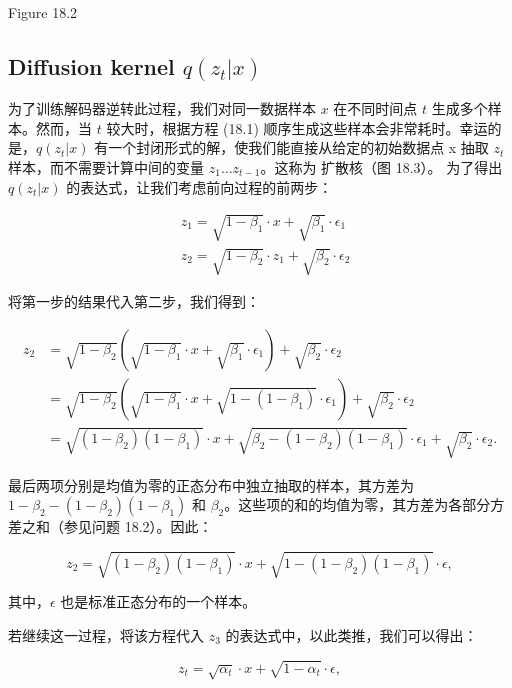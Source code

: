Figure 18.2
\subsection{Diffusion kernel \(q(z_t|x)\)}
为了训练解码器逆转此过程，我们对同一数据样本 \(x\) 在不同时间点 \(t\) 生成多个样本。然而，当 \(t\) 较大时，根据方程 (18.1) 顺序生成这些样本会非常耗时。幸运的是，\(q(z_t|x)\) 有一个封闭形式的解，使我们能直接从给定的初始数据点 x 抽取 \(z_t\) 样本，而不需要计算中间的变量 \(z_1 \ldots z_{t-1}\)。这称为 扩散核（图 18.3）。 为了得出 \(q(z_t|x)\) 的表达式，让我们考虑前向过程的前两步：


\begin{align}
&z_1 = \sqrt{1 - \beta_1} \cdot x + \sqrt{\beta_1} \cdot \epsilon_1 \\
&z_2 = \sqrt{1 - \beta_2} \cdot z_1 + \sqrt{\beta_2} \cdot \epsilon_2 
\end{align} 


将第一步的结果代入第二步，我们得到：

\begin{align}
z_2 &= \sqrt{1 - \beta_2} \left( \sqrt{1 - \beta_1} \cdot x + \sqrt{\beta_1} \cdot \epsilon_1 \right) + \sqrt{\beta_2} \cdot \epsilon_2 \\
&= \sqrt{1 - \beta_2} \left( \sqrt{1 - \beta_1} \cdot x + \sqrt{1 - (1 - \beta_1)} \cdot \epsilon_1 \right) + \sqrt{\beta_2} \cdot \epsilon_2 \\
&= \sqrt{(1 - \beta_2)(1 - \beta_1)} \cdot x + \sqrt{\beta_2 - (1 - \beta_2)(1 - \beta_1)} \cdot \epsilon_1 + \sqrt{\beta_2} \cdot \epsilon_2. 
\end{align} 


最后两项分别是均值为零的正态分布中独立抽取的样本，其方差为 \(1 - \beta_2 - (1 - \beta_2)(1 - \beta_1)\) 和 \(\beta_2\)。这些项的和的均值为零，其方差为各部分方差之和（参见问题 18.2）。因此：

\begin{equation}
z_2 = \sqrt{(1 - \beta_2)(1 - \beta_1)} \cdot x + \sqrt{1 - (1 - \beta_2)(1 - \beta_1)} \cdot \epsilon, 
\end{equation}

其中，\(\epsilon\) 也是标准正态分布的一个样本。


若继续这一过程，将该方程代入 \(z_3\) 的表达式中，以此类推，我们可以得出：

\begin{equation}
z_t = \sqrt{\alpha_t} \cdot x + \sqrt{1 - \alpha_t} \cdot \epsilon, 
\end{equation}

